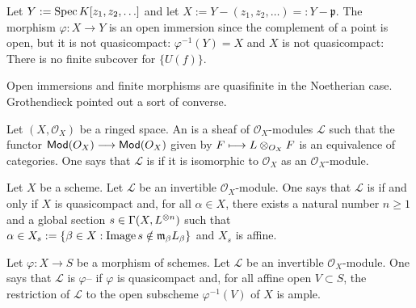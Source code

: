 \documentclass [11 pt, oneside] {article}
\begin{document}
\begin{example}[ ]\label{remember}\text{}
Let $Y:= \operatorname{Spec} K[z_1,z_2,\hdots]$ and let $X := Y - (z_1,z_2,\hdots) =: Y-\mathfrak{p}$. The morphism $\varphi : X\longrightarrow Y$ is an open immersion since the complement of a point is open, but it is not quasicompact: $\varphi^{-1}(Y)=X$ and $X$ is not quasicompact: There is no finite subcover for $\{U(f)\}$.
\end{example}

Open immersions and finite morphisms are quasifinite in the Noetherian case. Grothendieck pointed out a sort of converse.

\begin{definition}\label{this oneno}\text{}
Let $(X,\mathscr{O}_X)$ be a ringed space. An  is a sheaf of $\mathscr{O}_X$-modules $\mathscr{L}$ such that the functor $\textsf{Mod}({\relax{O}_X})\longrightarrow \textsf{Mod}({\relax{O}_X})$ given by $\relax{F}\longmapsto \relax{L}\otimes_{\relax{O}_X} \relax{F}$ is an equivalence of categories. One says that $\mathscr{L}$ is  if it is isomorphic to $\mathscr{O}_X$ as an $\mathscr{O}_X$-module.
\end{definition}

\begin{definition}\label{ample}\text{}
Let $X$ be a scheme. Let $\mathscr{L}$ be an invertible $\mathscr{O}_X$-module. One says that $\mathscr{L}$ is  if and only if $X$ is quasicompact and, for all $\alpha\in X$, there exists a natural number $n\ge 1$ and a global section $s\in \Gamma(X, \relax{L}^{\otimes n})$ such that $\alpha \in X_s := \{  \beta\in X :\operatorname{Image} s\notin \mathfrak{m}_\beta \relax{L}_\beta \}$ and $X_s$ is affine.
\end{definition}

\begin{definition}\label{}\text{}
Let $\varphi:X\longrightarrow S$ be a morphism of schemes. Let $\mathscr{L}$ be an invertible $\mathscr{O}_X$-module. One says that $\mathscr{L}$ is $\varphi$-- if $\varphi$ is quasicompact and, for all affine open $V\subset S$, the restriction of $\mathscr{L}$ to the open subscheme $\varphi ^{-1}(V)$ of $X$ is ample.
\end{definition}
\end{document}
